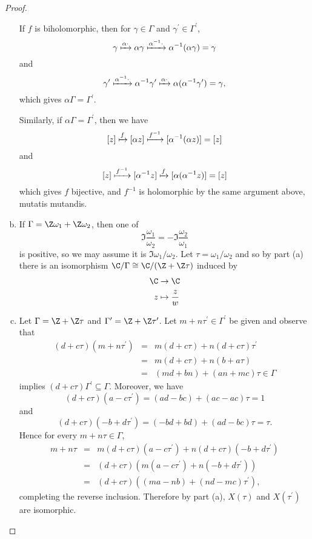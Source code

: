 \documentclass[10pt]{amsart}
\begin{document}
\begin{thm}
\begin{proof}
\begin{enumerate}[(a)]
      If $f$ is biholomorphic, then for $\gamma \in \Gamma$ and $\gamma^\prime \in \Gamma^\prime$,
      $$\gamma \xmapsto{\alpha \cdot} \alpha \gamma \xmapsto{\alpha^{-1} \cdot} \alpha^{-1}(\alpha \gamma) = \gamma$$
      and
      $$\gamma^\prime \xmapsto{\alpha^{-1} \cdot} \alpha^{-1} \gamma^\prime \xmapsto{\alpha \cdot} \alpha(\alpha^{-1} \gamma^\prime) = \gamma,$$
      which gives $\alpha\Gamma = \Gamma^\prime$.
      
      Similarly, if $\alpha\Gamma = \Gamma^\prime$, then we have
      $$[z] \xmapsto{f} [\alpha z] \xmapsto{f^{-1}} [\alpha^{-1}(\alpha z)] = [z]$$
      and
      $$[z] \xmapsto{f^{-1}} [\alpha^{-1} z] \xmapsto{f} [\alpha(\alpha^{-1} z)] = [z]$$
      which gives $f$ bijective, and $f^{-1}$ is holomorphic by the same argument above, mutatis mutandis.
    \item
      If $\Gamma = \Z\omega_1 + \Z\omega_2$, then one of 
      $$\Im{\frac{\omega_1}{\omega_2}} = -\Im{\frac{\omega_2}{\omega_1}}$$
      is positive, so we may assume it is $\Im{\omega_1/\omega_2}$.
      Let $\tau = \omega_1 / \omega_2$ and so by part (a) there is an isomorphism  $\C/\Gamma \cong \C/(\Z + \Z\tau)$ induced by
      \begin{align*}
        \C &\rightarrow \C\\
        z &\mapsto \frac{z}{w}
      \end{align*}
    \item
      Let $\Gamma = \Z + \Z\tau$ and $\Gamma^\prime = \Z + \Z\tau^\prime$.
      Let $m + n\tau^\prime \in \Gamma^\prime$ be given and observe that
      \begin{eqnarray*}
        (d + c\tau)(m + n\tau^\prime) &=& m(d + c\tau) + n(d + c\tau)\tau^\prime\\
        &=& m(d + c\tau) + n(b + a\tau)\\
        &=& (md + bn) + (an + mc)\tau \in \Gamma
      \end{eqnarray*}
      implies $(d + c\tau)\Gamma^\prime \subseteq \Gamma$.
      Moreover, we have 
      $$(d + c\tau)(a - c\tau^\prime) = (ad - bc) + (ac - ac)\tau = 1$$
      and
      $$(d + c\tau)(-b + d\tau^\prime) = (-bd + bd) + (ad - bc)\tau = \tau.$$
      Hence for every $m + n\tau \in \Gamma$,
      \begin{eqnarray*}
        m + n\tau &=& m(d + c\tau)(a - c\tau^\prime) + n(d + c\tau)(-b + d\tau^\prime)\\
        &=& (d + c\tau)(m(a - c\tau^\prime) + n(-b + d\tau^\prime))\\
        &=& (d + c\tau)((ma - nb) + (nd -mc)\tau^\prime),
      \end{eqnarray*}
      completing the reverse inclusion.
      Therefore by part (a), $X(\tau)$ and $X(\tau^\prime)$ are isomorphic.
    \end{enumerate}
  \end{proof}
\end{thm}
\end{document}
